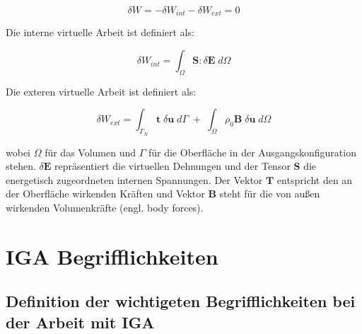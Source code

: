 \documentclass[german,a4paper,12pt,oneside]{scrbook}
\theoremstyle{definition}
\theoremstyle{definition}
\theoremstyle{definition}
\theoremstyle{definition}
\theoremstyle{definition}
\theoremstyle{definition}
\begin{document}
\begin{equation}        
    \delta W = - \delta W_{int} - \delta W_{ext} = 0    
\end{equation}      

\vspace{0.5cm}
Die interne virtuelle Arbeit ist definiert als:

\begin{equation}
    \delta W_{int} = \int_{\Omega}^{} \bm{S} : \delta \bm{E} \; d \Omega
\end{equation}

\vspace{0.5cm}
Die exteren virtuelle Arbeit ist definiert als:

\begin{equation}
    \delta W_{ext} = \int_ {\Gamma_N}{} \bm{t} \; \delta \bm{u} \; d \Gamma \; 
    + \; \int_{\Omega}{} \rho_0 \bm{B} \; \delta \bm{u} \; d \Omega
\end{equation}


\vspace{0.5cm}
wobei $\Omega$ für das Volumen und $\Gamma$ für die Oberfläche in der Ausgangskonfiguration stehen. $\delta \bm{E}$ repräsentiert die virtuellen Dehnungen und der Tensor $\bm{S}$ die energetisch zugeordneten internen Spannungen. Der Vektor $\bm{T}$ entspricht den an der Oberfläche wirkenden Kräften und Vektor $\bm{B}$ steht für die von außen wirkenden Volumenkräfte (engl. body forces). 




\chapter{IGA Begrifflichkeiten}  \setcounter{page}{1}   %

\section{Definition der wichtigeten Begrifflichkeiten bei der Arbeit mit IGA}

\end{document}
